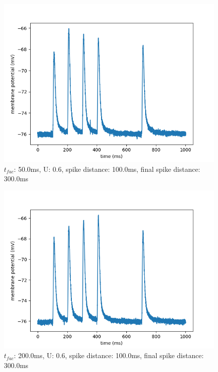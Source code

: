 \documentclass[10pt,a4paper]{scrartcl}
\begin{document}
\begin{figure} [ht]
\begin{center}
\label{fig:abb29}
\caption{$t_{fac}$: 50.0ms, U: 0.6, spike distance: 100.0ms, final spike distance: 300.0ms}
\includegraphics[scale=0.35]{pictures/final_spike_variation_19.pdf} 
\end{center}
\end{figure}

\begin{figure} [ht]
\begin{center}
\label{fig:abb30}
\caption{$t_{fac}$: 200.0ms, U: 0.6, spike distance: 100.0ms, final spike distance: 300.0ms}
\includegraphics[scale=0.35]{pictures/final_spike_variation_20.pdf} 
\end{center}
\end{figure}
\end{document}
